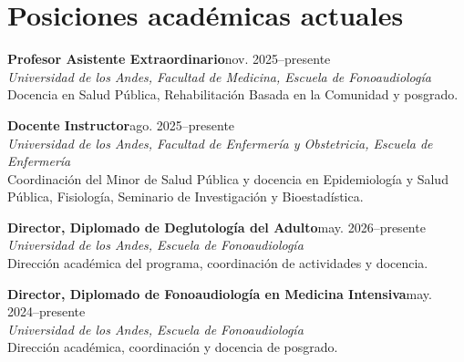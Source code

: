\documentclass[10pt,a4paper]{article}
\newcommand{\entry}[4]{%
\textbf{#1}\hfill {\small #2}\\
{\emph{#3}}\\[-1pt]
#4\par\vspace{4pt}}
\begin{document}
\section*{Posiciones académicas actuales}
\entry{Profesor Asistente Extraordinario}{nov. 2025--presente}{Universidad de los Andes, Facultad de Medicina, Escuela de Fonoaudiología}{Docencia en Salud Pública, Rehabilitación Basada en la Comunidad y posgrado.}
\entry{Docente Instructor}{ago. 2025--presente}{Universidad de los Andes, Facultad de Enfermería y Obstetricia, Escuela de Enfermería}{Coordinación del Minor de Salud Pública y docencia en Epidemiología y Salud Pública, Fisiología, Seminario de Investigación y Bioestadística.}
\entry{Director, Diplomado de Deglutología del Adulto}{may. 2026--presente}{Universidad de los Andes, Escuela de Fonoaudiología}{Dirección académica del programa, coordinación de actividades y docencia.}
\entry{Director, Diplomado de Fonoaudiología en Medicina Intensiva}{may. 2024--presente}{Universidad de los Andes, Escuela de Fonoaudiología}{Dirección académica, coordinación y docencia de posgrado.}
\end{document}
